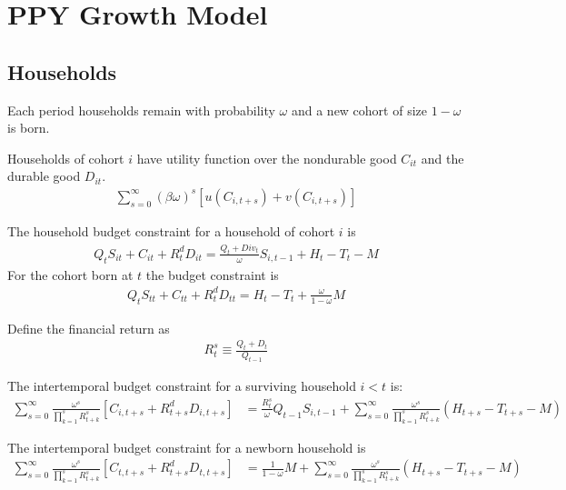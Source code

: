 \documentclass[11pt]{article}
\begin{document}
\section{PPY Growth Model}

\subsection{Households}

Each period households remain with probability $\omega$ and a new cohort of size $1-\omega$ is born.

Households of cohort $i$ have utility function over the nondurable good $C_{it}$ and the durable good $D_{it}$.
\begin{align*}
	\sum_{s=0}^{\infty}(\beta\omega)^s [ u(C_{i,t+s}) + v(C_{i,t+s}) ]
\end{align*}

The household budget constraint for a household of cohort $i$ is
\begin{align*}
    Q_t S_{it}+C_{it}+R_{t}^d D_{it}   = \frac{Q_{t}+Div_t}{\omega} S_{i,t-1}  + H_{t}  - T_{t} - M
\end{align*}
For the cohort born at $t$ the budget constraint is
\begin{align*}
    Q_t S_{tt}+C_{tt}+R_{t}^d D_{tt}    = H_{t}  - T_{t} + \frac{\omega}{1-\omega} M
\end{align*}

Define the financial return as
\begin{align*}
    R_t^s \equiv \frac{Q_{t}+D_t}{Q_{t-1}}
\end{align*}


The intertemporal budget constraint for a surviving household $i<t$ is:
\begin{align*}
	\sum_{s=0}^{\infty}\frac{\omega^s}{\prod_{k=1}^{s}R_{t+k}^s} [C_{i,t+s} + R_{t+s}^d D_{i,t+s}] & = \frac{R_{t}^s}{\omega}Q_{t-1}S_{i,t-1} + \sum_{s=0}^{\infty}\frac{\omega^s}{\prod_{k=1}^{s}R_{t+k}^s}(H_{t+s}  - T_{t+s} - M)
\end{align*}

The intertemporal budget constraint for a newborn household is
\begin{align*}
	\sum_{s=0}^{\infty}\frac{\omega^s}{\prod_{k=1}^{s}R_{t+k}^s} [C_{t,t+s} + R_{t+s}^d D_{t,t+s}]  & = \frac{1}{1-\omega} M + \sum_{s=0}^{\infty}\frac{\omega^s}{\prod_{k=1}^{s}R_{t+k}^s}(H_{t+s}  - T_{t+s} - M)
\end{align*}
\end{document}

